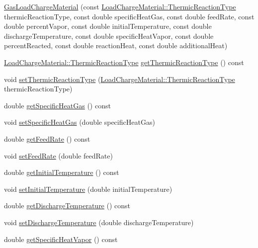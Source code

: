 \begin{DoxyCompactItemize}
\hyperlink{class_gas_load_charge_material_a4ad94a94d25bad9eaeca4947d879f35f}{Gas\+Load\+Charge\+Material} (const \hyperlink{namespace_load_charge_material_a51d4263e865a5d86236622dd3fe23fd1}{Load\+Charge\+Material\+::\+Thermic\+Reaction\+Type} thermic\+Reaction\+Type, const double specific\+Heat\+Gas, const double feed\+Rate, const double percent\+Vapor, const double initial\+Temperature, const double discharge\+Temperature, const double specific\+Heat\+Vapor, const double percent\+Reacted, const double reaction\+Heat, const double additional\+Heat)
\item 
\hyperlink{namespace_load_charge_material_a51d4263e865a5d86236622dd3fe23fd1}{Load\+Charge\+Material\+::\+Thermic\+Reaction\+Type} \hyperlink{class_gas_load_charge_material_ac801f30ccf58ce98fdb6b8cdb0a9767f}{get\+Thermic\+Reaction\+Type} () const
\item 
void \hyperlink{class_gas_load_charge_material_ac48eb07a3008f1dc0ff433353b59536d}{set\+Thermic\+Reaction\+Type} (\hyperlink{namespace_load_charge_material_a51d4263e865a5d86236622dd3fe23fd1}{Load\+Charge\+Material\+::\+Thermic\+Reaction\+Type} thermic\+Reaction\+Type)
\item 
double \hyperlink{class_gas_load_charge_material_a66e956e7a52b1032a3e8a725f26fa580}{get\+Specific\+Heat\+Gas} () const
\item 
void \hyperlink{class_gas_load_charge_material_a07bf6d4ee9161683fbeb3baad16ea7be}{set\+Specific\+Heat\+Gas} (double specific\+Heat\+Gas)
\item 
double \hyperlink{class_gas_load_charge_material_ae14ebe9b7091a491166174968505b6ee}{get\+Feed\+Rate} () const
\item 
void \hyperlink{class_gas_load_charge_material_a922b728dfd109d1c1684d7dfad82ec8e}{set\+Feed\+Rate} (double feed\+Rate)
\item 
double \hyperlink{class_gas_load_charge_material_af8a83c3720d108baa196394105822db7}{get\+Initial\+Temperature} () const
\item 
void \hyperlink{class_gas_load_charge_material_aec9ddfce5e31099b6a047e3d98d80d47}{set\+Initial\+Temperature} (double initial\+Temperature)
\item 
double \hyperlink{class_gas_load_charge_material_a6baaf6ad65e2a3d1fa90b7c007bc3c53}{get\+Discharge\+Temperature} () const
\item 
void \hyperlink{class_gas_load_charge_material_a6c53344d5370a1e9b7321a530a6843c0}{set\+Discharge\+Temperature} (double discharge\+Temperature)
\item 
double \hyperlink{class_gas_load_charge_material_a9a07e86938bb831e51ac3f53f696a3c3}{get\+Specific\+Heat\+Vapor} () const

\end{DoxyCompactItemize}
